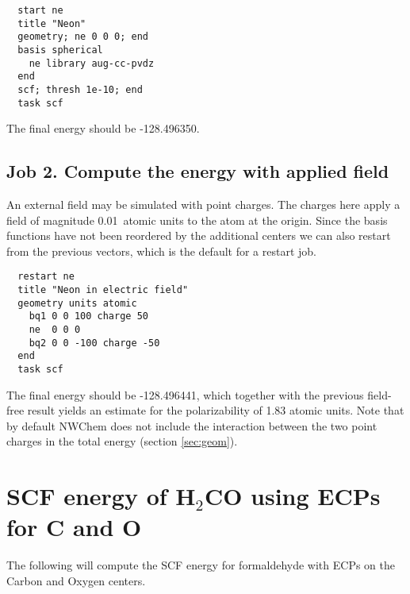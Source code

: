 \begin{verbatim}
  start ne
  title "Neon"
  geometry; ne 0 0 0; end
  basis spherical 
    ne library aug-cc-pvdz
  end
  scf; thresh 1e-10; end
  task scf
\end{verbatim}

The final energy should be -128.496350.

\subsection{Job 2. Compute the energy with applied field}

An external field may be simulated with point charges.  The charges
here apply a field of magnitude 0.01\ atomic units to the atom at the
origin.  Since the basis functions have not been reordered by the
additional centers we can also restart from the previous vectors,
which is the default for a restart job.

\begin{verbatim}
  restart ne
  title "Neon in electric field"
  geometry units atomic
    bq1 0 0 100 charge 50
    ne  0 0 0
    bq2 0 0 -100 charge -50
  end
  task scf
\end{verbatim}

The final energy should be -128.496441, which together with the
previous field-free result yields an estimate for the polarizability
of 1.83 atomic units.  Note that by default NWChem does not include
the interaction between the two point charges in the total energy
(section \ref{sec:geom}).

\section{SCF energy of H$_2$CO using ECPs for C and O}
\label{sec:sample3}

The following will compute the SCF energy for formaldehyde with ECPs
on the Carbon and Oxygen centers.

